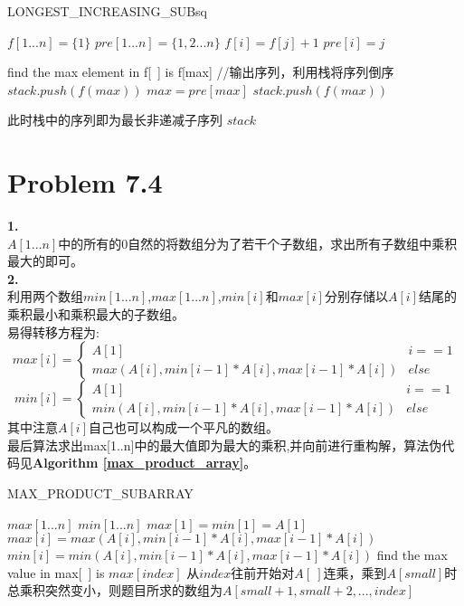 \documentclass[onecolumn]{ctexart}
\begin{document}
\begin{algorithm}[htbp]
	\caption{LONGEST\_INCREASING\_SUBsq}
	\label{longest increasing}
	\begin{algorithmic}[1]
		\STATE $f[1...n]=\{1\}$
		\STATE $pre[1...n]=\{1,2...n\}$
					\STATE $f[i]=f[j]+1$
					\STATE $pre[i]=j$
				\ENDIF
			\ENDFOR
		\ENDFOR
		
		\STATE find the max element in f[\ ] is f[max]
		\STATE //输出序列，利用栈将序列倒序
		\STATE $stack.push(f(max))$
			\STATE $max=pre[max]$
			\STATE $stack.push(f(max))$
		\ENDWHILE
		
		\STATE 此时栈中的序列即为最长非递减子序列
		\RETURN $stack$		
	\end{algorithmic}
\end{algorithm}

\section*{Problem 7.4}
\noindent \textbf{1.}\\
\indent $A[1...n]$中的所有的0自然的将数组分为了若干个子数组，求出所有子数组中乘积最大的即可。\\

\noindent \textbf{2.}\\
\indent 利用两个数组$min[1...n]$,$max[1...n]$,$min[i]$和$max[i]$分别存储以$A[i]$结尾的乘积最小和乘积最大的子数组。\\
\indent 易得转移方程为:\\
\[
max[i]=
\begin{cases}
A[1] &i==1\\
max(A[i],min[i-1]*A[i],max[i-1]*A[i]) &else
\end{cases}
\]
\[
min[i]=
\begin{cases}
A[1] &i==1\\
min(A[i],min[i-1]*A[i],max[i-1]*A[i])&else
\end{cases}
\]
\indent 其中注意$A[i]$自己也可以构成一个平凡的数组。\\
\indent 最后算法求出max[1..n]中的最大值即为最大的乘积,并向前进行重构解，算法伪代码见\textbf{Algorithm \ref{max_product_array}}。
\begin{algorithm}[htbp]
	\caption{MAX\_PRODUCT\_SUBARRAY}
	\label{max_product_array}
	\begin{algorithmic}[1]
		\STATE $max[1...n]$
		\STATE $min[1...n]$
		\STATE $max[1]=min[1]=A[1]$
			\STATE $max[i]=max(A[i],min[i-1]*A[i],max[i-1]*A[i])$
			\STATE $min[i]=min(A[i],min[i-1]*A[i],max[i-1]*A[i])$
		\ENDFOR
		\STATE find the max value in max[\ ] is $max[index]$
		\STATE 从$index$往前开始对$A[\ ]$连乘，乘到$A[small]$时总乘积突然变小，则题目所求的数组为$A[small+1,small+2,...,index]$
	\end{algorithmic}
\end{algorithm}
\end{document}
